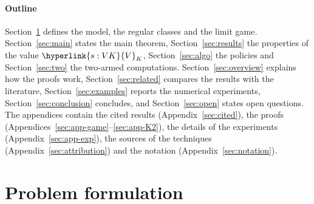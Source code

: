 \documentclass[11pt]{article}
\DeclareRobustCommand{\sy}[2]{{\hyperlink{#1}{#2}}}
\newcommand{\1}{\mathbf{1}}
\newcommand{\VK}{\sy{s:VK}{V}}
\begin{document}
\paragraph{Outline}
Section~\ref{sec:setting} defines the model, the regular classes and the limit game. Section~\ref{sec:main} states the main theorem,
Section~\ref{sec:results} the properties of the value $\VK_K$, Section~\ref{sec:algo} the policies and Section~\ref{sec:two} the two-armed
computations. Section~\ref{sec:overview} explains how the proofs work, Section~\ref{sec:related} compares the results with the literature,
Section~\ref{sec:examples} reports the numerical experiments, Section~\ref{sec:conclusion} concludes, and Section~\ref{sec:open} states open questions. The appendices contain the
cited results (Appendix~\ref{sec:cited}), the proofs (Appendices~\ref{sec:app-game}--\ref{sec:app-K2}), the details of the experiments
(Appendix~\ref{sec:app-exp}), the sources of the techniques (Appendix~\ref{sec:attribution}) and the notation (Appendix~\ref{sec:notation}).

\setcounter{tocdepth}{1}
\tableofcontents


\section{Problem formulation}\label{sec:setting}
\end{document}
